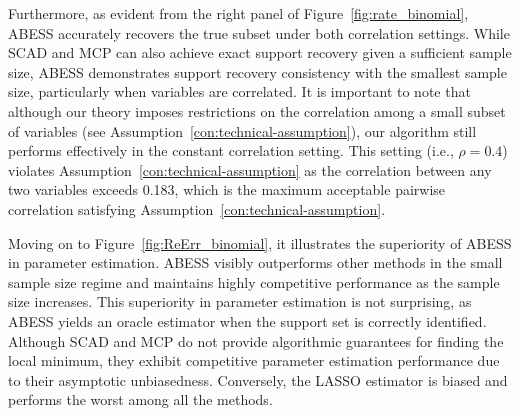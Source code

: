 Furthermore, as evident from the right panel of Figure~\ref{fig:rate_binomial}, ABESS accurately recovers the true subset under both correlation settings. While SCAD and MCP can also achieve exact support recovery given a sufficient sample size, ABESS demonstrates support recovery consistency with the smallest sample size, particularly when variables are correlated. It is important to note that although our theory imposes restrictions on the correlation among a small subset of variables (see Assumption~\ref{con:technical-assumption}), our algorithm still performs effectively in the constant correlation setting. This setting (i.e., $\rho=0.4$) violates Assumption~\ref{con:technical-assumption} as the correlation between any two variables exceeds 0.183, which is the maximum acceptable pairwise correlation satisfying Assumption~\ref{con:technical-assumption}.

Moving on to Figure~\ref{fig:ReErr_binomial}, it illustrates the superiority of ABESS in parameter estimation. ABESS visibly outperforms other methods in the small sample size regime and maintains highly competitive performance as the sample size increases. This superiority in parameter estimation is not surprising, as ABESS yields an oracle estimator when the support set is correctly identified. Although SCAD and MCP do not provide algorithmic guarantees for finding the local minimum, they exhibit competitive parameter estimation performance due to their asymptotic unbiasedness. Conversely, the LASSO estimator is biased and performs the worst among all the methods.


